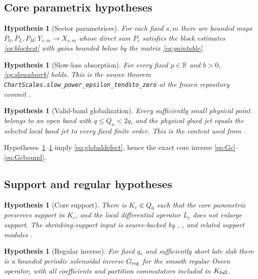 \documentclass[11pt]{article}
\newtheorem{hypothesis}[theorem]{Hypothesis}
\numberwithin{equation}{section}
\newcommand{\R}{\mathbb R}
\begin{document}
\subsection{Core parametrix hypotheses}
\begin{hypothesis}[Sector parametrices]\label{hyp:param}
For each fixed \(s,m\) there are bounded maps \(P_0,P_L,P_H:Y_{s,m}\to X_{s,m}\) whose direct sum \(P_c\) satisfies the block estimates \eqref{eq:blockest} with gains bounded below by the matrix \eqref{eq:gaintable}.
\end{hypothesis}

\begin{hypothesis}[Slow-loss absorption]\label{hyp:slow}
For every fixed \(p\in\R\) and \(b>0\), \eqref{eq:slowabsorb} holds.  This is the source theorem \texttt{ChartScales.\allowbreak slow\_power\_epsilon\_tendsto\_zero} at the frozen repository commit \cite{OpenAIRepo2026}.
\end{hypothesis}

\begin{hypothesis}[Valid-band globalization]\label{hyp:band}
Every sufficiently small physical point belongs to an open band with \(q\le Q_n<2q\), and the physical glued jet equals the selected local band jet to every fixed finite order.  This is the content used from  \cite{OpenAIRepo2026}.
\end{hypothesis}

Hypotheses~\ref{hyp:param}--\ref{hyp:band} imply \eqref{eq:globaldefect}, hence the exact core inverse \eqref{eq:Gc}--\eqref{eq:Gcbound}.

\subsection{Support and regular hypotheses}
\begin{hypothesis}[Core support]\label{hyp:support}
There is \(K_c\Subset Q_0\) such that the core parametrix preserves support in \(K_c\), and the local differential operator \(L_c\) does not enlarge support.  The shrinking-support input is source-backed by , , and related support modules \cite{OpenAIRepo2026}.
\end{hypothesis}

\begin{hypothesis}[Regular inverse]\label{hyp:reg}
For fixed \(q_*\) and sufficiently short late slab there is a bounded periodic solenoidal inverse \(G_{\rm reg}\) for the smooth regular Oseen operator, with all coefficients and partition commutators included in \(K_{\rm full}\).
\end{hypothesis}
\end{document}
